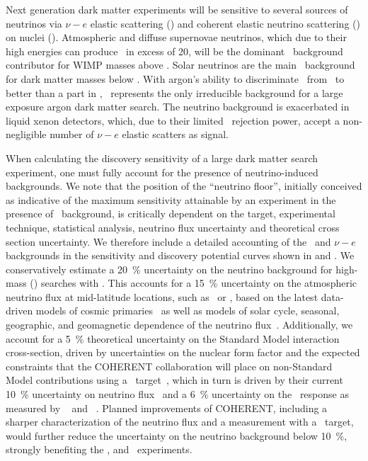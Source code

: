 Next generation dark matter experiments will be sensitive to several sources of neutrinos via $\nu-e$ elastic scattering (\ER) and coherent elastic neutrino scattering (\CEnNS) on nuclei (\NR). Atmospheric and diffuse supernovae neutrinos, which due to their high energies can produce \NRs\ in excess of \SI{20}{\keVr}, will be the dominant \CEnNS\ background contributor for WIMP masses above \DSkHighMassThreshold. Solar neutrinos are the main \CEnNS\ background for dark matter masses below \DSlLowMassThreshold. With  argon's ability to discriminate \ER\ from \NR\ to better than a part in \DEAPPSDRejection, \CEnNS\ represents the only irreducible background for a large exposure argon dark matter search. The neutrino background is exacerbated in liquid xenon detectors, which, due to their limited \ER\ rejection power, accept a non-negligible number of $\nu-e$ elastic scatters as signal. 

When calculating the discovery sensitivity of a large dark matter search experiment, one must fully account for the presence of neutrino-induced backgrounds.  We note that the position of the ``neutrino floor'', initially conceived as indicative of the maximum sensitivity attainable by an experiment in the presence of \CEnNS\ background, is critically dependent on the target, experimental technique, statistical analysis, neutrino flux uncertainty and theoretical cross section uncertainty. We therefore include a detailed accounting of the \CEnNS\ and $\nu-e$ backgrounds in the sensitivity and discovery potential curves shown in  and . We conservatively estimate a \SI{20}{\percent} uncertainty on the neutrino background for high-mass (\DSkHighMassThreshold) searches with \Argo.  This accounts for a \SI{15}{\percent} uncertainty on the atmospheric neutrino flux at mid-latitude locations, such as \SNOLAB\ or \LNGS, based on the latest data-driven models of cosmic primaries~\cite{Evans:2017hu} as well as models of solar cycle, seasonal, geographic, and geomagnetic dependence of the neutrino flux~\cite{Honda:2011ey,Barr:2006ih}.  Additionally, we account for a \SI{5}{\percent} theoretical uncertainty on the Standard Model interaction cross-section, driven by uncertainties on the nuclear form factor and the expected constraints that the COHERENT collaboration will place on non-Standard Model contributions using a \LAr\ target~\cite{Tayloe:2018jn}, which in turn is driven by their current \SI{10}{\percent} uncertainty on neutrino flux~\cite{Akimov:2017bs} and a \SI{6}{\percent} uncertainty on the \LAr\ response as measured by \SCENE~\cite{Cao:2015ks,Alexander:2013ke} and \ARIS~\cite{Agnes:2018cn}.  Planned improvements of COHERENT, including a sharper characterization of the neutrino flux and a measurement with a \LAr\ target, would further reduce the uncertainty on the neutrino background below \SI{10}{\percent}, strongly benefiting the \DSks, and \Argo\ experiments.

